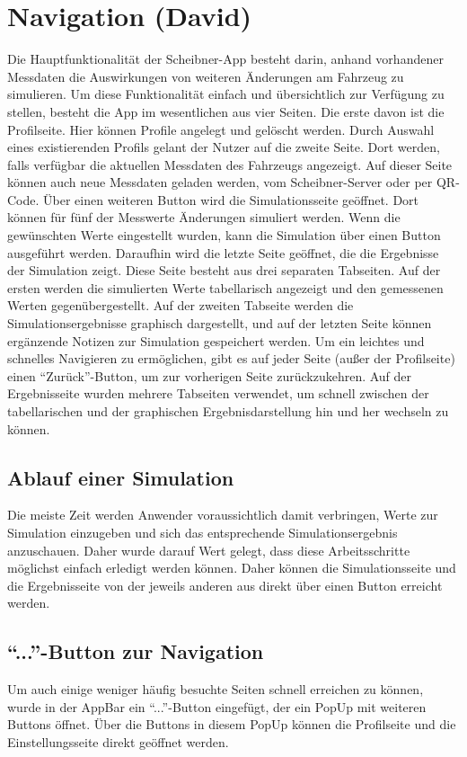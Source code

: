\chapter{Navigation (David)}
\label{chap:nav}

Die Hauptfunktionalität der Scheibner-App besteht darin, anhand vorhandener Messdaten die Auswirkungen von weiteren Änderungen am Fahrzeug zu simulieren. Um diese Funktionalität einfach und übersichtlich zur Verfügung zu stellen, besteht die App im wesentlichen aus vier Seiten. Die erste davon ist die Profilseite. Hier können Profile angelegt und gelöscht werden. Durch Auswahl eines existierenden Profils gelant der Nutzer auf die zweite Seite. Dort werden, falls verfügbar die aktuellen Messdaten des Fahrzeugs angezeigt. Auf dieser Seite können auch neue Messdaten geladen werden, vom Scheibner-Server oder per QR-Code.
Über einen weiteren Button wird die Simulationsseite geöffnet. Dort können für fünf der Messwerte Änderungen simuliert werden. Wenn die gewünschten Werte eingestellt wurden, kann die Simulation über einen Button ausgeführt werden. Daraufhin wird die letzte Seite geöffnet, die die Ergebnisse der Simulation zeigt. Diese Seite besteht aus drei separaten Tabseiten. Auf der ersten werden die simulierten Werte tabellarisch angezeigt und den gemessenen Werten gegenübergestellt. Auf der zweiten Tabseite werden die Simulationsergebnisse graphisch dargestellt, und auf der letzten Seite können ergänzende Notizen zur Simulation gespeichert werden.
Um ein leichtes und schnelles Navigieren zu ermöglichen, gibt es auf jeder Seite (außer der Profilseite) einen ``Zurück''-Button, um zur vorherigen Seite zurückzukehren. Auf der Ergebnisseite wurden mehrere Tabseiten verwendet, um schnell zwischen der tabellarischen und der graphischen Ergebnisdarstellung hin und her wechseln zu können.

	\section{Ablauf einer Simulation}
	\label{sec:sim-ablauf}
    Die meiste Zeit werden Anwender voraussichtlich damit verbringen, Werte zur Simulation einzugeben und sich das entsprechende Simulationsergebnis anzuschauen. Daher wurde darauf Wert gelegt, dass diese Arbeitsschritte möglichst einfach erledigt werden können.
    Daher können die Simulationsseite und die Ergebnisseite von der jeweils anderen aus direkt über einen Button erreicht werden.
	
	\section{``...''-Button zur Navigation}
	\label{sec:change-prof}
    Um auch einige weniger häufig besuchte Seiten schnell erreichen zu können, wurde in der AppBar ein ``...''-Button eingefügt, der ein PopUp mit weiteren Buttons öffnet. Über die Buttons in diesem PopUp können die Profilseite und die Einstellungsseite direkt geöffnet werden.
    
